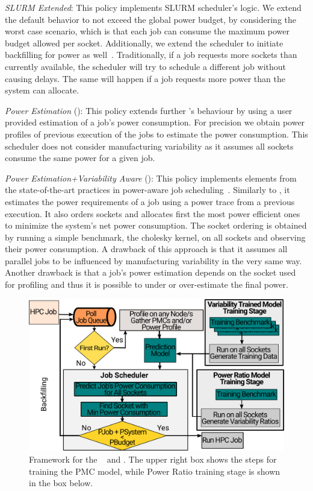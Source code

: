 \textit{SLURM Extended}: This policy implements SLURM scheduler's logic.  We extend the default behavior to not exceed the global power budget, by considering the worst case scenario, 
which is that each job can consume the maximum power budget allowed per socket.
Additionally, we extend the scheduler to initiate backfilling for power as well~\cite{Patki:2015:PRM:2749246.2749262}.  
Traditionally, if a job requests more sockets than currently available, the scheduler will try to schedule a different job without causing delays.  
The same will happen if a job requests more power than the system can allocate.
\par
\textit{Power Estimation} (\PESched): This policy extends further \DefaultSched's behaviour by using a user provided estimation of a job's power consumption.  
For precision we obtain power profiles of previous execution of the jobs to estimate the power consumption. 
This scheduler does not consider manufacturing variability as it assumes all sockets consume the same power for a given job. 
\par
\textit{Power Estimation+Variability Aware} (\PEVASched): This policy implements elements from the state-of-the-art practices in power-aware job scheduling~\cite{Gholkar:2016:PTH:2967938.2967961,Inadomi:2015:AMI:2807591.2807638}. 
Similarly to \PESched, it estimates the power requirements of a job using a power trace from a previous execution.  
It also orders sockets and allocates first the most power efficient ones to minimize the system's net power consumption.
The socket ordering is obtained by running a simple benchmark, the cholesky kernel, on all sockets and observing their power consumption.  
A drawback of this approach is that it assumes all parallel jobs to be influenced by manufacturing variability in the very same way.
Another drawback is that a job's power estimation depends on the socket used for profiling and thus it is possible to under or over-estimate the final power.

\begin{figure}[!t]
				\centering
        \includegraphics[width=.9\textwidth]{power_aware_job_scheduling/figures/pred_policy_recipe}
        \caption{Framework for the \PRVSSched~ and \PMCVSSched. The upper right box shows the steps for training the PMC model, while Power Ratio training stage is shown in the box below.  }
        \label{fig:pred_policy_recipe}
				\vspace{.5cm}
\end{figure}


